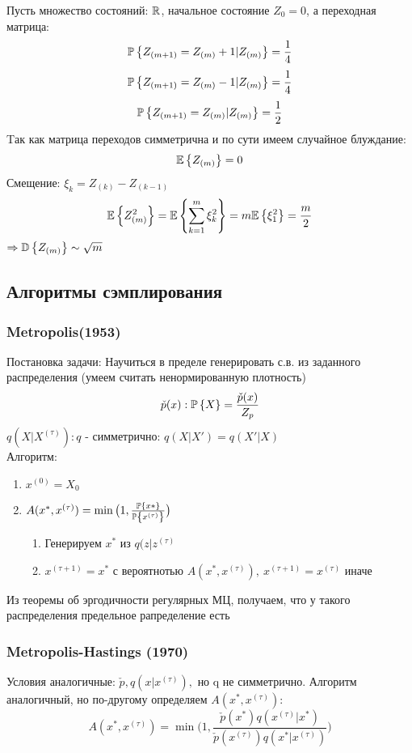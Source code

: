 \begin{example}
Пусть множество состояний: $\mathbb{R}$, начальное состояние $Z_0=0$, а переходная матрица: 
$$ \mathbb{P}\left\{ Z_{(m+1)} = Z_{(m)} + 1|Z_{(m)} \right\} = \frac{1}{4} $$
$$ \mathbb{P}\left\{ Z_{(m+1)} = Z_{(m)} - 1|Z_{(m)} \right\} = \frac{1}{4} $$
$$ \mathbb{P}\left\{ Z_{(m+1)} = Z_{(m)}|Z_{(m)} \right\} = \frac{1}{2} $$
Tак как матрица переходов симметрична и по сути имеем случайное блуждание:
$$\mathbb{E}\left\{ Z_{(m)} \right\} = 0$$ 
Смещение: $\xi_k = Z_{(k)}-Z_{(k-1)}$
$$ \mathbb{E}\left\{ Z_{(m)}^2 \right\} = \mathbb{E}\left\{ \sum_{k=1}^m \xi_k^2 \right\} = m \mathbb{E}\left\{ \xi_1^2 \right\} = \frac{m}{2} $$
$\Rightarrow \mathbb{D}\left\{ Z_{(m)} \right\} \sim \sqrt{m}$
\end{example}

\subsection*{Алгоритмы сэмплирования}
\subsubsection*{Metropolis(1953)}
Постановка задачи: Научиться в пределе генерировать с.в. из заданного распределения (умеем считать ненормированную плотность) $$ \check{p}(x): \mathbb{P}\left\{ X \right\} = \frac{\check{p}(x)}{Z_p} $$
$q(X|X^{(\tau)}): q$ - симметрично: $q(X|X') = q(X'|X)$ \\

Алгоритм: \begin{enumerate}
	\item $x^{(0)} = X_0$
	\item $A(x^*, x^{(\tau)}) = \min \big( 1, \frac{\mathbb{P}\left\{ x* \right\}}{\mathbb{P}\left\{ x^{(\tau)} \right\}}\big)$
	\begin{enumerate}
		\item Генерируем $x^*$ из $q(z|z^{(\tau)}$
		\item $x^{(\tau+1)} = x^*$ с вероятнотью $A(x^*, x^{(\tau)}), \ x^{(\tau+1)} = x^{(\tau)}$ иначе
	\end{enumerate}
\end{enumerate}

Из теоремы об эргодичности регулярных МЦ, получаем, что у такого распределения предельное рапределение есть


\subsubsection*{Metropolis-Hastings (1970)}
Условия аналогичные: $\check{p}, q(x|x^{(\tau)}), $ но q не симметрично.
Алгоритм аналогичный, но по-другому определяем $A(x^*, x^{(\tau)})$:
$$ A(x^*, x^{(\tau)}) = \min \big( 1, \frac{\check{p}(x^*) q(x^{(\tau)}|x^*)}{\check{p}(x^{(\tau)}) q(x^*|x^{(\tau)})}\big) $$

